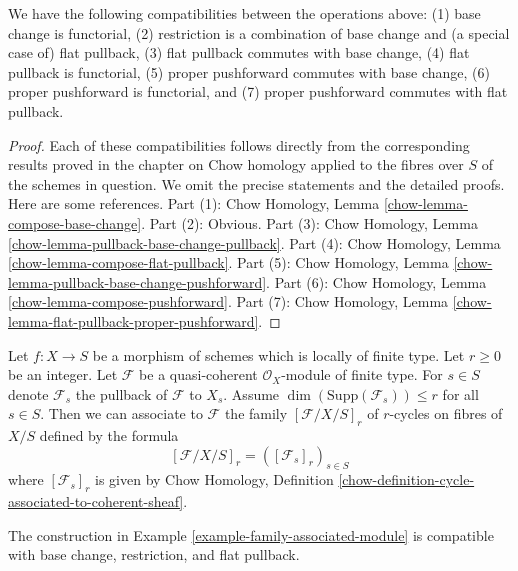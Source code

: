 \begin{lemma}
\label{lemma-compatibilities}
We have the following compatibilities between the operations above:
(1) base change is functorial,
(2) restriction is a combination of base change and (a special case of)
flat pullback,
(3) flat pullback commutes with base change,
(4) flat pullback is functorial,
(5) proper pushforward commutes with base change,
(6) proper pushforward is functorial, and
(7) proper pushforward commutes with flat pullback.
\end{lemma}

\begin{proof}
Each of these compatibilities follows directly from the corresponding
results proved in the chapter on Chow homology applied to the fibres
over $S$ of the schemes in question. We omit the precise statements and
the detailed proofs. Here are some references.
Part (1): Chow Homology, Lemma
\ref{chow-lemma-compose-base-change}.
Part (2): Obvious.
Part (3): Chow Homology, Lemma
\ref{chow-lemma-pullback-base-change-pullback}.
Part (4): Chow Homology, Lemma
\ref{chow-lemma-compose-flat-pullback}.
Part (5): Chow Homology, Lemma
\ref{chow-lemma-pullback-base-change-pushforward}.
Part (6): Chow Homology, Lemma
\ref{chow-lemma-compose-pushforward}.
Part (7): Chow Homology, Lemma
\ref{chow-lemma-flat-pullback-proper-pushforward}.
\end{proof}

\begin{example}
\label{example-family-associated-module}
Let $f : X \to S$ be a morphism of schemes which is locally of finite type.
Let $r \geq 0$ be an integer. Let $\mathcal{F}$ be a quasi-coherent
$\mathcal{O}_X$-module of finite type. For $s \in S$ denote $\mathcal{F}_s$
the pullback of $\mathcal{F}$ to $X_s$.
Assume $\dim(\text{Supp}(\mathcal{F}_s)) \leq r$ for all $s \in S$.
Then we can associate to $\mathcal{F}$ the family $[\mathcal{F}/X/S]_r$ of
$r$-cycles on fibres of $X/S$ defined by the formula
$$
[\mathcal{F}/X/S]_r = ([\mathcal{F}_s]_r)_{s \in S}
$$
where $[\mathcal{F}_s]_r$ is given by Chow Homology, Definition
\ref{chow-definition-cycle-associated-to-coherent-sheaf}.
\end{example}

\begin{lemma}
\label{lemma-family-associated-module}
The construction in Example \ref{example-family-associated-module}
is compatible with base change, restriction, and flat pullback.
\end{lemma}

